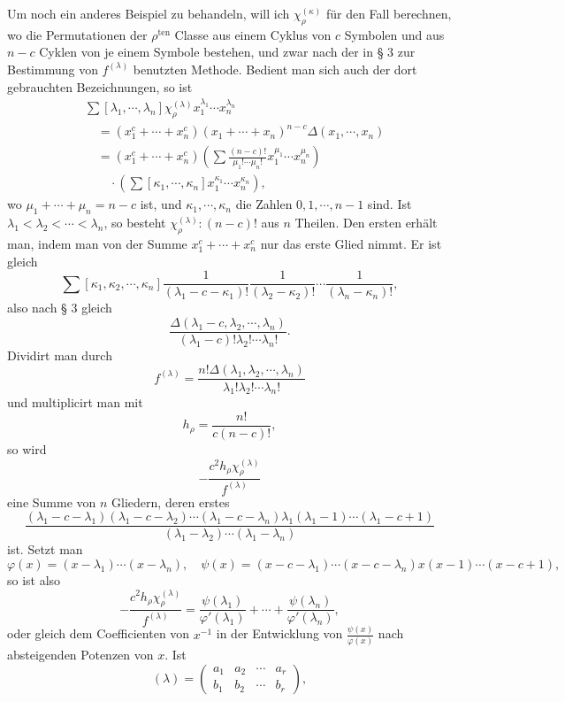 \documentclass[11pt]{article}
\newcommand{\ten}{\mathrm{ten}}
\begin{document}
Um noch ein anderes Beispiel zu behandeln, will ich $\chi_\rho^{(\kappa)}$ für den Fall berechnen, wo die Permutationen der $\rho^{\ten}$ Classe aus einem Cyklus von $c$ Symbolen und aus $n-c$ Cyklen von je einem Symbole bestehen, und zwar nach der in § 3 zur Bestimmung von $f^{(\lambda)}$ benutzten Methode. Bedient man sich auch der dort gebrauchten Bezeichnungen, so ist
\[
\begin{aligned}
 &\sum[\lambda_1,
\cdots,
\lambda_n]\chi_\rho^{(\lambda)}x_1^{\lambda_1}\cdots x_n^{\lambda_n} \\
 &\quad=(x_1^c+
\cdots+x_n^c)(x_1+
\cdots+x_n)^{n-c}\Delta(x_1,
\cdots,x_n)\\
 &\quad=(x_1^c+
\cdots+x_n^c)
 \left(\sum\frac{(n-c)!}{\mu_1!\cdots\mu_n!}x_1^{\mu_1}\cdots x_n^{\mu_n}\right)\\
 &\qquad\cdot
 \left(\sum[\kappa_1,
\cdots,
\kappa_n]x_1^{\kappa_1}\cdots x_n^{\kappa_n}\right),
\end{aligned}
\]
wo $\mu_1+
\cdots+
\mu_n=n-c$ ist, und $\kappa_1,
\cdots,
\kappa_n$ die Zahlen $0,1,
\cdots,n-1$ sind. Ist $\lambda_1<\lambda_2<\cdots<\lambda_n$, so besteht $\chi_\rho^{(\lambda)}:(n-c)!$ aus $n$ Theilen. Den ersten erhält man, indem man von der Summe $x_1^c+
\cdots+x_n^c$ nur das erste Glied nimmt. Er ist gleich
\[
 \sum[\kappa_1,
\kappa_2,
\cdots,
\kappa_n]\frac1{(\lambda_1-c-
\kappa_1)!}\frac1{(\lambda_2-
\kappa_2)!}\cdots\frac1{(\lambda_n-
\kappa_n)!},
\]
also nach § 3 gleich
\[
 \frac{\Delta(\lambda_1-c,
\lambda_2,
\cdots,
\lambda_n)}{(\lambda_1-c)!\lambda_2!\cdots\lambda_n!}.
\]
Dividirt man durch
\[
 f^{(\lambda)}=\frac{n!\Delta(\lambda_1,
\lambda_2,
\cdots,
\lambda_n)}{\lambda_1!\lambda_2!\cdots\lambda_n!}
\]
und multiplicirt man mit
\[
 h_\rho=\frac{n!}{c(n-c)!},
\]
so wird
\[
 -\frac{c^2h_\rho\chi_\rho^{(\lambda)}}{f^{(\lambda)}}
\]
eine Summe von $n$ Gliedern, deren erstes
\[
 \frac{(\lambda_1-c-
\lambda_1)(\lambda_1-c-
\lambda_2)\cdots(\lambda_1-c-
\lambda_n)\lambda_1(\lambda_1-1)\cdots(\lambda_1-c+1)}{(\lambda_1-
\lambda_2)\cdots(\lambda_1-
\lambda_n)}
\]
ist. Setzt man
\[
 \varphi(x)=(x-
\lambda_1)\cdots(x-
\lambda_n),
\quad
 \psi(x)=(x-c-
\lambda_1)\cdots(x-c-
\lambda_n)x(x-1)\cdots(x-c+1),
\]
so ist also
\[
 -\frac{c^2h_\rho\chi_\rho^{(\lambda)}}{f^{(\lambda)}}=
 \frac{\psi(\lambda_1)}{\varphi'(\lambda_1)}+
\cdots+
\frac{\psi(\lambda_n)}{\varphi'(\lambda_n)},
\]
oder gleich dem Coefficienten von $x^{-1}$ in der Entwicklung von $\frac{\psi(x)}{\varphi(x)}$ nach absteigenden Potenzen von $x$. Ist
\[
 (\lambda)=\left(\begin{matrix}a_1&a_2&\cdots&a_r\\ b_1&b_2&\cdots&b_r\end{matrix}\right),
\]
\end{document}
